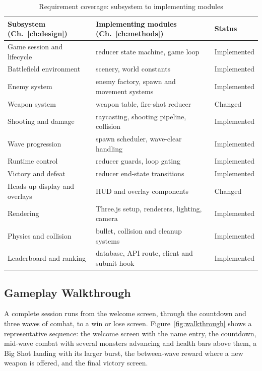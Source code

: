 \documentclass[12pt,a4paper]{report}
\begin{document}
\begin{table}[htbp]
\centering
\caption{Requirement coverage: subsystem to implementing modules}
\label{tab:trace}
\begin{tabular}{|p{4.0cm}|p{5.6cm}|p{2.8cm}|}
\hline
Subsystem (Ch.~\ref{ch:design}) & Implementing modules (Ch.~\ref{ch:methods}) & Status \\
\hline
Game session and lifecycle & reducer state machine, game loop & Implemented \\
\hline
Battlefield environment & scenery, world constants & Implemented \\
\hline
Enemy system & enemy factory, spawn and movement systems & Implemented \\
\hline
Weapon system & weapon table, fire-shot reducer & Changed \\
\hline
Shooting and damage & raycasting, shooting pipeline, collision & Implemented \\
\hline
Wave progression & spawn scheduler, wave-clear handling & Implemented \\
\hline
Runtime control & reducer guards, loop gating & Implemented \\
\hline
Victory and defeat & reducer end-state transitions & Implemented \\
\hline
Heads-up display and overlays & HUD and overlay components & Changed \\
\hline
Rendering & Three.js setup, renderers, lighting, camera & Implemented \\
\hline
Physics and collision & bullet, collision and cleanup systems & Implemented \\
\hline
Leaderboard and ranking & database, API route, client and submit hook & Implemented \\
\hline
\end{tabular}
\end{table}

\subsection{Gameplay Walkthrough}

A complete session runs from the welcome screen, through the countdown and three
waves of combat, to a win or lose screen. Figure~\ref{fig:walkthrough} shows a
representative sequence: the welcome screen with the name entry, the countdown,
mid-wave combat with several monsters advancing and health bars above them, a Big
Shot landing with its larger burst, the between-wave reward where a new weapon is
offered, and the final victory screen.
\end{document}
